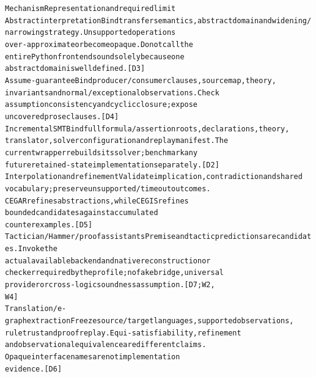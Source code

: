 \documentclass{article}
\begin{document}
\begingroup\fontsize{7}{8.4}\selectfont
\begin{alltt}
Mechanism                                    Representation and required limit
Abstract interpretation                      Bind transfer semantics, abstract domain and widening/
                                             narrowing strategy. Unsupported operations
                                             over-approximate or become opaque. Do not call the
                                             entire Python front end sound solely because one
                                             abstract domain is well defined. [D3]
Assume-guarantee                             Bind producer/consumer clauses, source map, theory,
                                             invariants and normal/exceptional observations. Check
                                             assumption consistency and cyclic closure; expose
                                             uncovered prose clauses. [D4]
Incremental SMT                              Bind full formula/assertion roots, declarations, theory,
                                             translator, solver configuration and replay manifest. The
                                             current wrapper rebuilds its solver; benchmark any
                                             future retained-state implementation separately. [D2]
Interpolation and refinement                 Validate implication, contradiction and shared
                                             vocabulary; preserve unsupported/timeout outcomes.
                                             CEGAR refines abstractions, while CEGIS refines
                                             bounded candidates against accumulated
                                             counterexamples. [D5]
Tactician / Hammer / proof assistants        Premise and tactic predictions are candidates. Invoke the
                                             actual available backend and native reconstruction or
                                             checker required by the profile; no fake bridge, universal
                                             provider or cross-logic soundness assumption. [D7; W2,
                                             W4]
Translation / e-graph extraction             Freeze source/target languages, supported observations,
                                             rule trust and proof replay. Equi-satisfiability, refinement
                                             and observational equivalence are different claims.
                                             Opaque interface names are not implementation
                                             evidence. [D6]
\end{alltt}\endgroup
\end{document}
